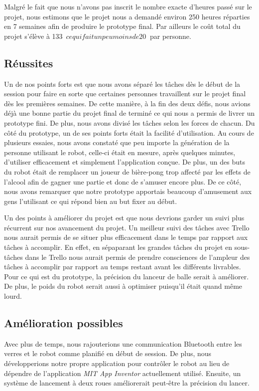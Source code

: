 Malgré le fait que nous n'avons pas inscrit le nombre exacte d'heures passé sur le projet, nous estimons que le projet nous a demandé environ 250 heures réparties en 7 semaines afin de produire le prototype final. Par ailleurs le coût total du projet s'élève à 133~$ ce qui fait un peu moins de 20~$ par personne.

\subsection{Réussites}

Un de nos points forts est que nous avons séparé les tâches dès le début de la session pour faire en sorte que certaines personnes travaillent sur le projet final dès les premières semaines. De cette manière, à la fin des deux défis, nous avions déjà une bonne partie du projet final de terminé ce qui nous a permis de livrer un prototype fini. De plus, nous avons divisé les tâches selon les forces de chacun. Du côté du prototype, un de ses points forts était la facilité d'utilisation. Au cours de plusieurs essaies, nous avons constaté que peu importe la génération de la personne utilisant le robot, celle-ci était en mesure, après quelques minutes, d'utiliser efficacement et simplement l'application conçue. De plus, un des buts du robot était de remplacer un joueur de bière-pong trop affecté par les effets de l'alcool afin de gagner une partie et donc de s'amuser encore plus. De ce côté, nous avons remarquer que notre prototype apportais beaucoup d'amusement aux gens l'utilisant ce qui répond bien au but fixer au début. 

Un des points à améliorer du projet est que nous devrions garder un suivi plus récurrent sur nos avancement du projet. Un meilleur suivi des tâches avec Trello nous aurait permis de se situer plus efficacement dans le temps par rapport aux tâches à accomplir. En effet, en sépaparant les grandes tâches du projet en sous-tâches dans le Trello nous aurait permis de prendre consciences de l'ampleur des tâches à accomplir par rapport au temps restant avant les différents livrables. Pour ce qui est du prototype, la précision du lanceur de balle serait à améliorer. De plus, le poids du robot serait aussi à optimiser puisqu'il était quand même lourd. 

\subsection{Amélioration possibles}


Avec plus de temps, nous rajouterions une communication Bluetooth entre les verres et le robot comme planifié en début de session.
De plus, nous développerions notre propre application pour contrôler le robot au lieu de dépendre de l’application \emph{MIT App Inventor} actuellement utilisé. Ensuite, un système de lancement à deux roues améliorerait peut-être la précision du lancer.
